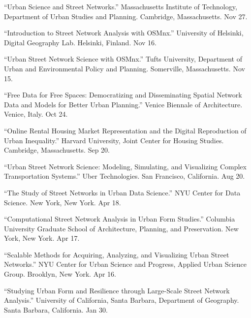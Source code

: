 \documentclass[11pt,letterpaper]{report} %
\begin{document}
\begin{tablist}
\item[2018] \tab{}\enquote{Urban Science and Street Networks.} Massachusetts Institute of Technology, Department of Urban Studies and Planning. Cambridge, Massachusetts. Nov 27.

\item[2018] \tab{}\enquote{Introduction to Street Network Analysis with OSMnx.} University of Helsinki, Digital Geography Lab. Helsinki, Finland. Nov 16.

\item[2018] \tab{}\enquote{Urban Street Network Science with OSMnx.} Tufts University, Department of Urban and Environmental Policy and Planning. Somerville, Massachusetts. Nov 15.

\item[2018] \tab{}\enquote{Free Data for Free Spaces: Democratizing and Disseminating Spatial Network Data and Models for Better Urban Planning.} Venice Biennale of Architecture. Venice, Italy. Oct 24.

\item[2018] \tab{}\enquote{Online Rental Housing Market Representation and the Digital Reproduction of Urban Inequality.} Harvard University, Joint Center for Housing Studies. Cambridge, Massachusetts. Sep 20.

\item[2018] \tab{}\enquote{Urban Street Network Science: Modeling, Simulating, and Visualizing Complex Transportation Systems.} Uber Technologies. San Francisco, California. Aug 20.

\item[2018] \tab{}\enquote{The Study of Street Networks in Urban Data Science.} NYU Center for Data Science. New York, New York. Apr 18.

\item[2018] \tab{}\enquote{Computational Street Network Analysis in Urban Form Studies.} Columbia University Graduate School of Architecture, Planning, and Preservation. New York, New York. Apr 17.

\item[2018] \tab{}\enquote{Scalable Methods for Acquiring, Analyzing, and Visualizing Urban Street Networks.} NYU Center for Urban Science and Progress, Applied Urban Science Group. Brooklyn, New York. Apr 16.

\item[2018] \tab{}\enquote{Studying Urban Form and Resilience through Large-Scale Street Network Analysis.} University of California, Santa Barbara, Department of Geography. Santa Barbara, California. Jan 30.


\end{tablist}
\end{document}

